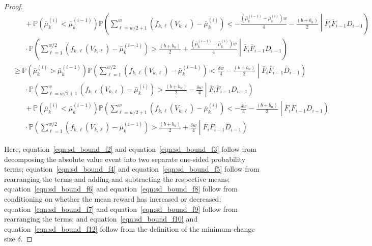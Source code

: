 \documentclass[twoside]{article}
\def\eqref#1{equation~\ref{#1}}
\theoremstyle{plain}
\theoremstyle{definition}
\theoremstyle{remark}
\begin{document}
\begin{proof}
\begin{subequations}
\begin{align}
        &\hspace{20pt} + \mathbb{P}\left(\bar{\mu}^{(i)}_{k}<\bar{\mu}^{(i-1)}_{k}\right)\mathbb{P}\left(\sum^{w}_{\ell=w/2+1}\left(f_{k,\ell}\left(V_{k,\ell}\right)-\bar{\mu}_{k}^{(i)}\right)< -\frac{\left(\bar{\mu}^{(i-1)}_{k}-\bar{\mu}^{(i)}_{k}\right)w}{4}-\frac{\left(b+b_{n}\right)}{2} \middle| \overline{F}_{i}\overline{F}_{i-1} D_{i-1}\right)\label{eqn:sd_bound_f8}\\
        &\hspace{20pt} \cdot \mathbb{P}\left(\sum^{w/2}_{\ell=1}\left(f_{k,\ell}\left(V_{k,\ell}\right)-\bar{\mu}_{k}^{(i-1)}\right) > \frac{\left(b+b_{n}\right)}{2} + \frac{\left(\bar{\mu}^{(i-1)}_{k}-\bar{\mu}^{(i)}_{k}\right)w}{4} \middle| \overline{F}_{i}\overline{F}_{i-1} D_{i-1}\right)\label{eqn:sd_bound_f9}\\
        &\geq \mathbb{P}\left(\bar{\mu}^{(i)}_{k}>\bar{\mu}^{(i-1)}_{k}\right)\mathbb{P}\left(\sum^{w/2}_{\ell=1}\left(f_{k,\ell}\left(V_{k,\ell}\right)-\bar{\mu}_{k}^{(i-1)}\right)< \frac{\delta w}{4}-\frac{\left(b+b_{n}\right)}{2} \middle| \overline{F}_{i}\overline{F}_{i-1} D_{i-1}\right)\label{eqn:sd_bound_f10}\\
        &\hspace{20pt} \cdot \mathbb{P}\left(\sum^{w}_{\ell=w/2+1}\left(f_{k,\ell}\left(V_{k,\ell}\right)-\bar{\mu}_{k}^{(i)}\right) > \frac{\left(b+b_{n}\right)}{2} - \frac{\delta w}{4} \middle| \overline{F}_{i}\overline{F}_{i-1} D_{i-1}\right)\label{eqn:sd_bound_f11}\\
        &\hspace{20pt} + \mathbb{P}\left(\bar{\mu}^{(i)}_{k}<\bar{\mu}^{(i-1)}_{k}\right)\mathbb{P}\left(\sum^{w}_{\ell=w/2+1}\left(f_{k,\ell}\left(V_{k,\ell}\right)-\bar{\mu}_{k}^{(i)}\right)< -\frac{\delta w}{4}-\frac{\left(b+b_{n}\right)}{2} \middle| \overline{F}_{i}\overline{F}_{i-1} D_{i-1}\right)\label{eqn:sd_bound_f12}\\
        &\hspace{20pt} \cdot \mathbb{P}\left(\sum^{w/2}_{\ell=1}\left(f_{k,\ell}\left(V_{k,\ell}\right)-\bar{\mu}_{k}^{(i-1)}\right) > \frac{\left(b+b_{n}\right)}{2} + \frac{\delta w}{4} \middle| \overline{F}_{i}\overline{F}_{i-1} D_{i-1}\right)\label{eqn:sd_bound_f13}
    \end{align}
\end{subequations}

Here, \eqref{eqn:sd_bound_f2} and \eqref{eqn:sd_bound_f3} follow from decomposing the absolute value event into two separate one-sided probability terms;
\eqref{eqn:sd_bound_f4} and \eqref{eqn:sd_bound_f5} follow from rearranging the terms and adding and subtracting the respective means;
\eqref{eqn:sd_bound_f6} and \eqref{eqn:sd_bound_f8} follow from conditioning on whether the mean reward has increased or decreased;
\eqref{eqn:sd_bound_f7} and \eqref{eqn:sd_bound_f9} follow from rearranging the terms;
and \eqref{eqn:sd_bound_f10} and \eqref{eqn:sd_bound_f12} follow from the definition of the minimum change size $\delta$.


\end{proof}
\end{document}
